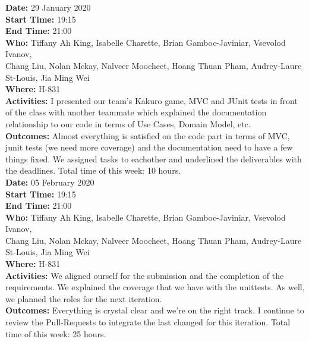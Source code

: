 \documentclass[12pt]{article}
\begin{document}
{\bf Date:} 29 January 2020\\
{\bf Start Time:} 19:15\\
{\bf End Time:} 21:00\\
{\bf Who:} Tiffany Ah King, Isabelle Charette, Brian Gamboc-Javiniar, Vsevolod Ivanov,\\
Chang Liu, Nolan Mckay, Nalveer Moocheet, Hoang Thuan Pham, Audrey-Laure St-Louis, Jia Ming Wei\\
{\bf Where:} H-831\\
{\bf Activities:} I presented our team's Kakuro game, MVC and JUnit tests in front of the class with another teammate which explained the documentation relationship to our code in terms of Use Cases, Domain Model, etc.\\
{\bf Outcomes:} Almost everything is satisfied on the code part in terms of MVC, junit tests (we need more coverage) and the documentation need to have a few things fixed. We assigned tasks to eachother and underlined the deliverables with the deadlines. Total time of this week: 10 hours.\\

{\bf Date:} 05 February 2020\\
{\bf Start Time:} 19:15\\
{\bf End Time:} 21:00\\
{\bf Who:} Tiffany Ah King, Isabelle Charette, Brian Gamboc-Javiniar, Vsevolod Ivanov,\\
Chang Liu, Nolan Mckay, Nalveer Moocheet, Hoang Thuan Pham, Audrey-Laure St-Louis, Jia Ming Wei\\
{\bf Where:} H-831\\
{\bf Activities:} We aligned ourself for the submission and the completion of the requirements. We explained the coverage that we have with the unittests. As well, we planned the roles for the next iteration.\\
{\bf Outcomes:} Everything is crystal clear and we're on the right track. I continue to review the Pull-Requests to integrate the last changed for this iteration. Total time of this week: 25 hours.\\


\end{document}
